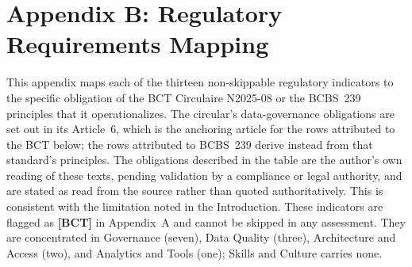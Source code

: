 \clearpage
{}
\section*{Appendix B: Regulatory Requirements Mapping}

This appendix maps each of the thirteen non-skippable regulatory indicators to the specific obligation of the BCT Circulaire N\textdegree{}2025-08 or the BCBS~239 principles that it operationalizes. The circular's data-governance obligations are set out in its Article~6, which is the anchoring article for the rows attributed to the BCT below; the rows attributed to BCBS~239 derive instead from that standard's principles. The obligations described in the table are the author's own reading of these texts, pending validation by a compliance or legal authority, and are stated as read from the source rather than quoted authoritatively. This is consistent with the limitation noted in the Introduction. These indicators are flagged as \textbf{[BCT]} in Appendix~A and cannot be skipped in any assessment. They are concentrated in Governance (seven), Data Quality (three), Architecture and Access (two), and Analytics and Tools (one); Skills and Culture carries none.

